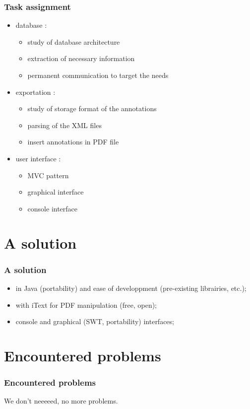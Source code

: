 \documentclass[t,12pt]{beamer}
\begin{document}
\begin{frame}
  \frametitle{Task assignment}
  \begin{itemize}
    \pause \item database :
	\begin{itemize}
		\item study of database architecture
		\item extraction of necessary information
		\item permanent communication to target the needs
	\end{itemize}
	\pause \item exportation :
	\begin{itemize}
		\item study of storage format of the annotations
		\item parsing of the XML files
		\item insert annotations in PDF file
	\end{itemize}
	\pause \item user interface :
	\begin{itemize}
		\item MVC pattern
		\item graphical interface
		\item console interface
	\end{itemize}
  \end{itemize}
\end{frame}

\section{A solution}
\begin{frame}
  \frametitle{A solution}
  \begin{itemize}
    \item in Java (portability) and ease of developpment (pre-existing
      librairies, etc.);
    \pause \item with iText for PDF manipulation (free, open);
    \pause \item console and graphical (SWT, portability) interfaces;
  \end{itemize}
\end{frame}

\section{Encountered problems}
\begin{frame}
  \frametitle{Encountered problems}
  We don't neeeeed, no more problems.
\end{frame}
\end{document}
